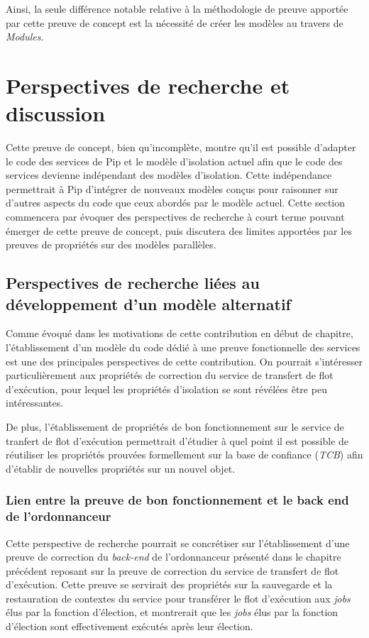 		Ainsi, la seule différence notable relative à la méthodologie de preuve apportée par cette preuve de concept est la nécessité de créer les modèles au travers de \emph{Modules}.

	\section{Perspectives de recherche et discussion}
		Cette preuve de concept, bien qu'incomplète, montre qu'il est possible d'adapter le code des services de Pip et le modèle d'isolation actuel afin que le code des services devienne indépendant des modèles d'isolation. Cette indépendance permettrait à Pip d'intégrer de nouveaux modèles conçus pour raisonner sur d'autres aspects du code que ceux abordés par le modèle actuel. Cette section commencera par évoquer des perspectives de recherche à court terme pouvant émerger de cette preuve de concept, puis discutera des limites apportées par les preuves de propriétés sur des modèles parallèles.

		\subsection{Perspectives de recherche liées au développement d'un modèle alternatif}
		Comme évoqué dans les motivations de cette contribution en début de chapitre, l'établissement d'un modèle du code dédié à une preuve fonctionnelle des services est une des principales perspectives de cette contribution. On pourrait s'intéresser particulièrement aux propriétés de correction du service de transfert de flot d'exécution, pour lequel les propriétés d'isolation se sont révélées être peu intéressantes.

		De plus, l'établissement de propriétés de bon fonctionnement sur le service de tranfert de flot d'exécution permettrait d'étudier à quel point il est possible de réutiliser les propriétés prouvées formellement sur la base de confiance (\emph{TCB}) afin d'établir de nouvelles propriétés sur un nouvel objet. 
		\subsubsection{Lien entre la preuve de bon fonctionnement et le back end de l'ordonnanceur}
	
		Cette perspective de recherche pourrait se concrétiser sur l'établissement d'une preuve de correction du \emph{back-end} de l'ordonnanceur présenté dans le chapitre précédent reposant sur la preuve de correction du service de transfert de flot d'exécution. Cette preuve se servirait des propriétés sur la sauvegarde et la restauration de contextes du service pour transférer le flot d'exécution aux \emph{jobs} élus par la fonction d'élection, et montrerait que les \emph{jobs} élus par la fonction d'élection sont effectivement exécutés après leur élection.

